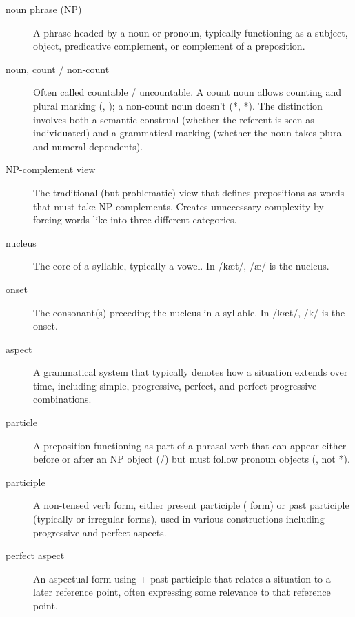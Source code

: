 \begin{description}
\item[noun phrase (NP)] A phrase headed by a noun or pronoun, typically functioning as a subject, object, predicative complement, or complement of a preposition.

\item[noun, count / non-count] Often called countable / uncountable. A count noun allows counting and plural marking (, ); a non-count noun doesn't (*, *). The distinction involves both a semantic construal (whether the referent is seen as individuated) and a grammatical marking (whether the noun takes plural and numeral dependents).

\item[NP-complement view] The traditional (but problematic) view that defines prepositions as words that must take NP complements. Creates unnecessary complexity by forcing words like  into three different categories.

\item[nucleus] The core of a syllable, typically a vowel. In  /k\ae t/, /\ae/ is the nucleus.

\item[onset] The consonant(s) preceding the nucleus in a syllable. In  /k\ae t/, /k/ is the onset.

\item[aspect] A grammatical system that typically denotes how a situation extends over time, including simple, progressive, perfect, and perfect-progressive combinations.

\item[particle] A preposition functioning as part of a phrasal verb that can appear either before or after an NP object (/) but must follow pronoun objects (, not *).

\item[participle] A non-tensed verb form, either present participle ( form) or past participle (typically  or irregular forms), used in various constructions including progressive and perfect aspects.

\item[perfect aspect] An aspectual form using  + past participle that relates a situation to a later reference point, often expressing some relevance to that reference point.


\end{description}
